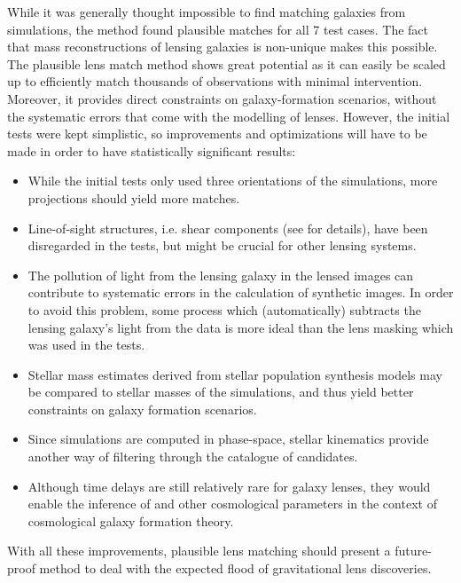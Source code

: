 While it was generally thought impossible to find matching galaxies from
simulations, the method found plausible matches for all 7 test cases.  The fact
that mass reconstructions of lensing galaxies is non-unique makes this possible.
The plausible lens match method shows great potential as it can easily be scaled
up to efficiently match thousands of observations with minimal intervention.
Moreover, it provides direct constraints on galaxy-formation scenarios, without
the systematic errors that come with the modelling of lenses.  However, the
initial tests were kept simplistic, so improvements and optimizations will have
to be made in order to have statistically significant results:
\begin{itemize}
    \item While the initial tests only used three orientations of the
    simulations, more projections should yield more matches.
    \item Line-of-sight structures, i.e. shear components (see 
    for details), have been disregarded in the tests, but might be crucial for
    other lensing systems.
    \item The pollution of light from the lensing galaxy in the lensed images
    can contribute to systematic errors in the calculation of synthetic images.
    In order to avoid this problem, some process which (automatically) subtracts
    the lensing galaxy's light from the data is more ideal than the lens masking
    which was used in the tests.
    \item Stellar mass estimates derived from stellar population synthesis
    models may be compared to stellar masses of the simulations, and thus yield
    better constraints on galaxy formation scenarios.
    \item Since simulations are computed in phase-space, stellar kinematics
    provide another way of filtering through the catalogue of candidates.
    \item Although time delays are still relatively rare for galaxy lenses, they
    would enable the inference of \Ho{} and other cosmological parameters in the
    context of cosmological galaxy formation theory.
\end{itemize}
With all these improvements, plausible lens matching should present a
future-proof method to deal with the expected flood of gravitational lens
discoveries.